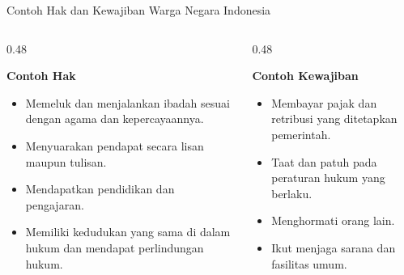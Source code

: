 \documentclass[11pt, aspectratio=169]{beamer}
\begin{document}
\begin{frame}{Contoh Hak dan Kewajiban Warga Negara Indonesia}
    \vspace{2mm}
    \begin{columns}[T]
        \begin{column}{0.48\textwidth}
            \begin{block}{\centering \textbf{Contoh Hak}}
                \footnotesize 
                \begin{itemize}
                    \item Memeluk dan menjalankan ibadah sesuai dengan agama dan kepercayaannya.
                    \item Menyuarakan pendapat secara lisan maupun tulisan.
                    \item Mendapatkan pendidikan dan pengajaran.
                    \item Memiliki kedudukan yang sama di dalam hukum dan mendapat perlindungan hukum.
                \end{itemize}
            \end{block}
        \end{column}
        \begin{column}{0.48\textwidth}
            \begin{block}{\centering \textbf{Contoh Kewajiban}}
                \footnotesize 
                \begin{itemize}
                    \item Membayar pajak dan retribusi yang ditetapkan pemerintah.
                    \item Taat dan patuh pada peraturan hukum yang berlaku.
                    \item Menghormati orang lain.
                    \item Ikut menjaga sarana dan fasilitas umum.
                \end{itemize}
            \end{block}
        \end{column}
    \end{columns}
\end{frame}
\end{document}
